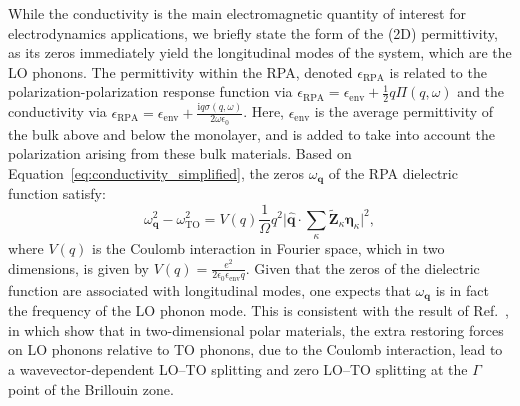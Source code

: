 \documentclass[aps,prb,twocolumn,
	           groupedaddress,superscriptaddress,
               amsfonts,amssymb,amsmath,floatfix,
	           citeautoscript]{revtex4-1}
\newcommand{\iu}{\mathrm{i}}
\begin{document}
While the conductivity is the main electromagnetic quantity of interest for electrodynamics applications, we briefly state the form of the (2D) permittivity, as its zeros immediately yield the longitudinal modes of the system, which are the LO phonons. The permittivity within the RPA, denoted $\epsilon_{\textrm{RPA}}$ is related to the polarization-polarization response function via \cite{jablan2009plasmonics} $\epsilon_{\textrm{RPA}} = \epsilon_{\mathrm{env}} + \frac{1}{2}q\Pi(q,\omega)$ and the conductivity via $\epsilon_{\textrm{RPA}} = \epsilon_{\mathrm{env}} + \frac{\iu q\sigma(q,\omega)}{2\omega\epsilon_0}$. Here, $\epsilon_{\mathrm{env}}$ is the average permittivity of the bulk above and below the monolayer, and is added to take into account the polarization arising from these bulk materials. Based on Equation~\eqref{eq:conductivity_simplified}, the zeros $\omega_{\mathbf{q}}$ of the RPA dielectric function satisfy:
\begin{equation}
    \omega^2_{\mathbf{q}} - \omega^2_{\mathrm{TO}} = V(q)\frac{1}{\Omega}q^2\Big|\hat{\mathbf{q}}\cdot\sum\limits_{\kappa}\tilde{\mathbf{Z}}_{\kappa}\boldsymbol{\eta}_{\kappa}\Big|^2,
    \label{eq:zerosofresponse}
\end{equation}
  where $V(q)$ is the Coulomb interaction in Fourier space, which in two dimensions, is given by $V(q) = \frac{e^2}{2\epsilon_0\epsilon_{\mathrm{env}}q}$. Given that the zeros of the dielectric function are associated with longitudinal modes, one expects that $\omega_{\mathbf{q}}$ is in fact the frequency of the LO phonon mode. This is consistent with the result of Ref.~, in which \relax{{}\ } \citeauthor{sohier2017breakdown} show that in two-dimensional polar materials, the extra restoring forces on LO phonons relative to TO phonons, due to the Coulomb interaction, lead to a wavevector-dependent LO--TO splitting and zero LO--TO splitting at the $\Gamma$ point of the Brillouin zone. 
  
\end{document}
